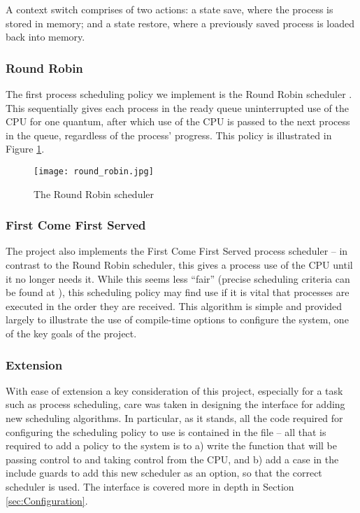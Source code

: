         A context switch comprises of two actions: a state save, where the
        process is stored in memory; and a state restore, where a previously
        saved process is loaded back into memory.

    \subsubsection{Round Robin}
        \label{sec:RoundRobin}
        The first process scheduling policy we implement is the Round Robin
        scheduler \cite[pg.~271]{DinosaurOS}. This sequentially gives each
        process in the ready queue uninterrupted use of the CPU for one quantum,
        after which use of the CPU is passed to the next process in the queue,
        regardless of the process' progress. This policy is illustrated in
        Figure \ref{fig:RoundRobin}.

        \begin{figure}
            \centering
            \texttt{[image: round\_robin.jpg]}
            \caption{The Round Robin scheduler}
            \label{fig:RoundRobin}
        \end{figure}

    \subsubsection{First Come First Served}
        The project also implements the First Come First Served process
        scheduler -- in contrast to the Round Robin scheduler, this gives a
        process use of the CPU until it no longer needs it. While this seems
        less ``fair'' (precise scheduling criteria can be found at
        \cite[pg.~265]{DinosaurOS}), this scheduling policy may find use if it
        is vital that processes are executed in the order they are received.
        This algorithm is simple and provided largely to illustrate the use of
        compile-time options to configure the system, one of the key goals of
        the project.

    \subsubsection{Extension}
        With ease of extension a key consideration of this project, especially
        for a task such as process scheduling, care was taken in designing the
        interface for adding new scheduling algorithms. In particular, as it
        stands, all the code required for configuring the scheduling policy to
        use is contained in the file  -- all that is required to
        add a policy to the system is to a) write the function that will be
        passing control to and taking control from the CPU, and b) add a case in
        the include guards to add this new scheduler as an option, so that the
        correct scheduler is used. The interface is covered more in depth in
        Section \ref{sec:Configuration}.


